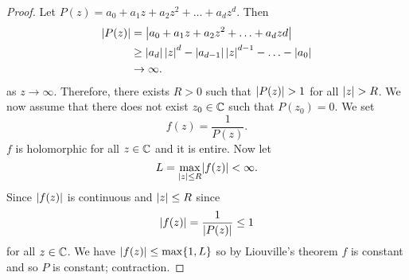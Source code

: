 \begin{proof}
    Let $P(z) = a_0 + a_1z + a_2z^2 + \ldots + a_dz^d$.
    Then
    \begin{align*}
        \left\lvert P(z)\right\rvert
        &=    \left\lvert a_0 + a_1z + a_2z^2 + \ldots + a_dzd\right\rvert \\
        &\geq \left\lvert a_d\right\rvert \left\lvert z\right\rvert^d - \left\lvert a_{d - 1}\right\rvert \left\lvert z\right\rvert^{d - 1} - \ldots - \left\lvert a_0\right\rvert \\
        &\to  \infty.
    \end{align*}
    as $z \to \infty$.
    Therefore, there exists $R>0$ such that 
    $\left\lvert P(z)\right\rvert > 1$
    for all 
    $\left\lvert z\right\rvert > R$.
    We now assume that there does not exist
    $z_0 \in \mathbb{C}$
    such that
    $P(z_0) = 0$.
    We set
    \[
        f(z) = \frac{1}{P(z)}. 
    \]
    $f$ is holomorphic for all $z \in \mathbb{C}$ and it is entire.
    Now let
    \[
        L = \max_{\left\lvert z\right\rvert \leq R} \lvert f(z) \rvert < \infty.
    \]
    Since $\left\lvert f(z)\right\rvert$ is continuous and
    $\left\lvert z\right\rvert \leq R$
    since 
    \[
        \left\lvert f(z)\right\rvert = \frac{1}{\left\lvert P(z)\right\rvert} \leq 1 
    \]
    for all $z \in \mathbb{C}$.
    We have $\left\lvert f(z)\right\rvert \leq \max\{1,L\}$
    so by Liouville's theorem $f$ is constant and so $P$ is constant; contraction. 
\end{proof}

